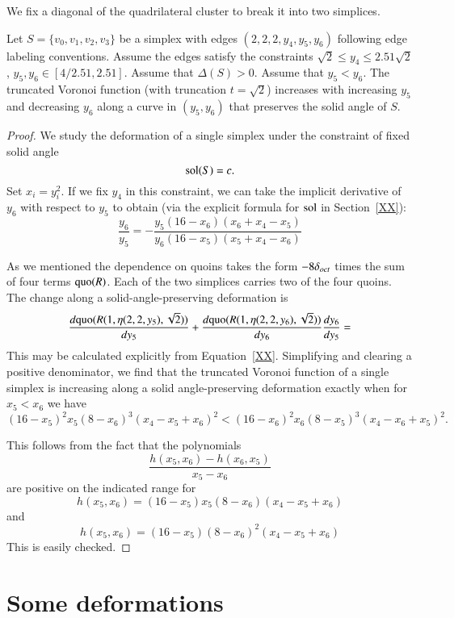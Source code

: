 We fix a diagonal of the quadrilateral cluster to break it into
two simplices.

\begin{lemma}
Let $S=\{v_0,v_1,v_2,v_3\}$ be a simplex with edges $(2,2,2,y_4,y_5,y_6)$
following edge labeling conventions.
Assume the 
edges satisfy the constraints $\sqrt2\le y_4\le 2.51\sqrt2$,
$y_5,y_6\in [4/2.51,2.51]$.  
Assume that $\Delta(S)>0$.  Assume that $y_5 < y_6$.  The
truncated Voronoi function (with truncation $t=\sqrt2$) increases
with increasing $y_5$ and decreasing $y_6$ along a curve in
$(y_5,y_6)$ that preserves the solid angle of $S$.
\end{lemma}



\begin{proof}
We study the deformation of a single simplex under the constraint
of fixed solid angle
    $$\operatorname{sol}(S) = c.$$
Set $x_i = y_i^2$.  If we fix $y_4$ in this constraint, we can
take the implicit derivative of $y_6$ with respect to $y_5$ to
obtain (via the explicit formula for $\operatorname{sol}$ in Section~\ref{XX}):
    $$
    \frac{y_6}{y_5} = -\frac{y_5 (16- x_6)(x_6 + x_4 - x_5 )}
    {y_6 (16-x_5)(x_5+x_4 - x_6)}
    $$

As we mentioned the dependence on quoins takes the form $-8\delta_{oct}$
times the sum of four terms $\operatorname{quo}(R)$.  Each of the two simplices
carries two of the four quoins.  The change along a
solid-angle-preserving deformation  is
    $$
    \frac{d {\operatorname{quo}}(R(1,\eta(2,2,y_5),\sqrt2))}{d y_5} + \frac{d
    {\operatorname{quo}}(R(1,\eta(2,2,y_6),\sqrt2))} {d y_6} \frac{d y_6}{d y_5} =
    $$
This may be calculated explicitly from Equation~\ref{XX}.
Simplifying and clearing a positive denominator, we find that the
truncated Voronoi function of a single simplex is increasing along
a solid angle-preserving deformation exactly when for $x_5 < x_6$
we have
    $$
    (16-x_5)^2 x_5 (8-x_6)^3 (x_4 - x_5 + x_6)^2 <
    (16-x_6)^2 x_6 (8-x_5)^3 (x_4 - x_6 + x_5)^2.
    $$

This follows from the fact that the polynomials
    $$
    \frac{h(x_5,x_6) - h(x_6,x_5)}{x_5 - x_6}
    $$
are positive on the indicated range for
    $$
    h(x_5,x_6) = (16-x_5) x_5 (8-x_6) (x_4 - x_5 + x_6)
    $$
and
    $$
    h(x_5,x_6) = (16-x_5) (8-x_6)^2 (x_4 - x_5 + x_6)
    $$
This is easily checked.
\end{proof}



\section{Some deformations} %


